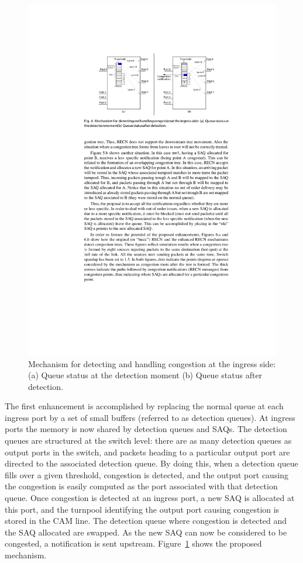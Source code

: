\documentclass[12pt]{article}
\begin{document}
\begin{figure}[ht]
	\centering
		\includegraphics[scale=1.2]{recn1.pdf}
		\caption{Mechanism for detecting and handling congestion at the ingress side: (a) Queue status at the detection moment (b) Queue status after detection.}
		\label{fig:recn1}
\end{figure}

The first enhancement is accomplished by replacing the normal queue at each ingress port by a set of small buffers (referred to as detection queues). At ingress ports the memory is now shared by detection queues and SAQs. The detection queues are structured at the switch level: there are as many detection queues as output ports in the switch, and packets heading to a particular output port are directed to the associated detection queue. By doing this, when a detection queue fills over a given threshold, congestion is detected, and the output port causing the congestion is easily computed as the port associated with that detection queue. Once congestion is detected at an ingress port, a new SAQ is allocated at this port, and the turnpool identifying the output port causing congestion is stored in the CAM line. The detection queue where congestion is detected and the SAQ allocated are swapped. As the new SAQ can now be considered to be congested, a notification is sent upstream. Figure~\ref{fig:recn1} shows the proposed mechanism.
\end{document}
